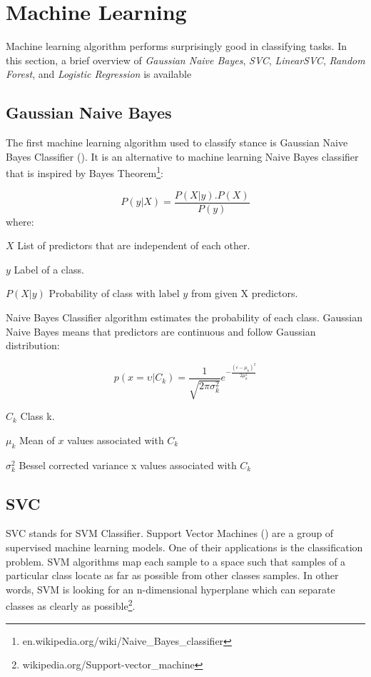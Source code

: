 \section{Machine Learning}
\label{lr:ml}
Machine learning algorithm performs surprisingly good in classifying tasks. In this section, a brief overview of \textit{Gaussian Naive Bayes}, \textit{SVC}, \textit{LinearSVC}, \textit{Random Forest}, and \textit{Logistic Regression} is available
\subsection{Gaussian Naive Bayes}
The first machine learning algorithm used to classify stance is Gaussian Naive Bayes Classifier (\cite{GNbayes}). It is an alternative to machine learning Naive Bayes classifier that is inspired by Bayes Theorem\footnote{en.wikipedia.org/wiki/Naive\_Bayes\_classifier}:

\[ P\left(y | X\right) =   \frac{P(X|y).P(X)}{P(y)} \]
where:
\begin{eqexpl}[25mm]
	\item{$X$} List of predictors that are independent of each other.
	\item{$y$} Label of a class.
	\item{$P\left(X|y\right)$} Probability of class with label $y$ from given X predictors.
\end{eqexpl}
Naive Bayes Classifier algorithm estimates the probability of each class. Gaussian Naive Bayes means that predictors are continuous and follow Gaussian distribution:

\[p\left(x=\upsilon | C_{k}\right) = \frac{1}{\sqrt{2\pi\sigma_{k}^{2}}}e^{-\frac{\left(\epsilon-\mu_{k}\right)^{2}}{2\mu^{2}_{k}}}\]
\begin{eqexpl}[25mm]
	\item{$C_{k}$} Class k.
	\item{$\mu_{k}$} Mean of $x$ values associated with $C_{k}$
	\item{$\sigma^{2}_{k}$} Bessel corrected variance x values associated with $C_{k}$
\end{eqexpl}

\subsection{SVC}
\label{SVM}
SVC stands for SVM Classifier. Support Vector Machines (\cite{svc})  are a group of supervised machine learning models. One of their applications is the classification problem. SVM algorithms map each sample to a space such that samples of a particular class locate as far as possible from other classes samples. In other words, SVM is looking for an n-dimensional hyperplane which can separate classes as clearly as possible\footnote{wikipedia.org/Support-vector\_machine}.

